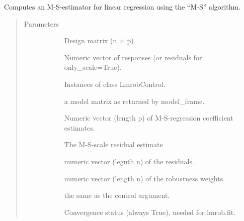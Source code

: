 \documentclass[letterpaper,10pt,english]{sphinxmanual}
\begin{document}
\begin{fulllineitems}
\label{\detokenize{_modules/lmrob:lmrob.lmrob_M_S}}
Computes an M-S-estimator for linear regression using the “M-S” algorithm.
\begin{quote}\begin{description}
\item[{Parameters}] \leavevmode\begin{description}
\item[{}] \leavevmode
Design matrix (n × p)

\item[{}] \leavevmode
Numeric vector of responses (or residuals for only\_scale=True).

\item[{}] \leavevmode
Instances of class LmrobControl.

\item[{}] \leavevmode
a model matrix as returned by model\_frame.

\item[{}] \leavevmode
\item[{}] \leavevmode
Numeric vector (length p) of M-S-regression coefficient estimates.

\item[{}] \leavevmode
The M-S-scale residual estimate

\item[{}] \leavevmode
numeric vector (legnth n) of the residuals.

\item[{}] \leavevmode
numeric vector (length n) of the robustness weights.

\item[{}] \leavevmode
the same as the control argument.

\item[{}] \leavevmode
Convergence status (always True), needed for lmrob.fit.

\end{description}


\end{description}
\end{quote}
\end{fulllineitems}
\end{document}
